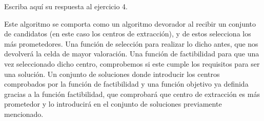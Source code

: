 Escriba aquí su respuesta al ejercicio 4.

Este algoritmo se comporta como un algoritmo devorador al recibir un conjunto de candidatos (en este caso los centros de
extracción), y de estos selecciona los más prometedores.
Una función de selección para realizar lo dicho antes, que nos devolverá la celda de mayor valoración.
Una función de factibilidad para que una vez seleccionado dicho centro, comprobemos si este cumple los requisitos
para ser una solución.
Un conjunto de soluciones donde introducir los centros comprobados por la función de factibilidad y una función
objetivo ya definida gracias a la función factibilidad, que comprobará que centro de extracción es más prometedor
y lo introducirá en el conjunto de soluciones previamente mencionado.
